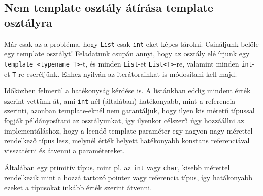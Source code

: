 \documentclass[../cpp_book/cpp_book.tex]{subfiles}
\begin{document}
	\subsection{Nem template osztály átírása template osztályra}
	Már csak az a probléma, hogy \texttt{List} csak \texttt{int}-eket képes tárolni. Csináljunk belőle egy template osztályt! Feladatunk csupán annyi, hogy az osztály elé írjunk egy \texttt{template <typename T>}-t, és minden \texttt{List}-et \texttt{List<T>}-re, valamint minden \texttt{int}-et \texttt{T}-re cseréljünk. Ehhez nyilván az iterátorainkat is módosítani kell majd.
	
	\medskip
	Időközben felmerül a hatékonyság kérdése is. A listánkban eddig mindent érték szerint vettünk át, ami \texttt{int}-nél (általában) hatékonyabb, mint a referencia szerinti, azonban template-eknél nem garantáljuk, hogy ilyen kis méretű típussal fogják példányosítani az osztályunkat, így ilyenkor célszerű úgy hozzáállni az implementáláshoz, hogy a leendő template paraméter egy nagyon nagy mérettel rendelkező típus lesz, melynél érték helyett hatékonyabb konstans referenciával visszatérni és átvenni a paramétereket.
	\begin{note}
		Általában egy primitív típus, mint pl. az \texttt{int} vagy \texttt{char}, kisebb mérettel rendelkezik mint a hozzá tartozó pointer vagy referencia típus, így hatákonyabb ezeket a típusokat inkább érték szerint átvenni.
	\end{note}
	
\end{document}

